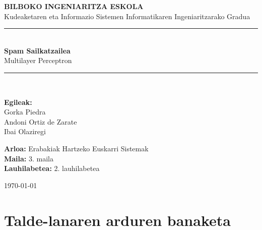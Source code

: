 \documentclass[12pt, a4paper]{article}
\begin{document}
\begin{titlepage}
    \centering
    \vspace*{1.5cm}
    {\Large \textbf{BILBOKO INGENIARITZA ESKOLA}}\\[0.3cm]
    {\normalsize Kudeaketaren eta Informazio Sistemen Informatikaren Ingeniaritzarako Gradua}\\[2cm]
    \rule{\textwidth}{1.5pt}\\[0.5cm]
    {\Huge \textbf{Spam Sailkatzailea}}\\[0.4cm]
    {\Large Multilayer Perceptron }\\[0.3cm]
    \rule{\textwidth}{1.5pt}\\[2cm]

    \begin{minipage}{0.45\textwidth}
        \textbf{Egileak:}\\
        Gorka Piedra\\
        Andoni Ortiz de Zarate\\
        Ibai Olaziregi\\
    \end{minipage}
    \begin{minipage}{0.45\textwidth}
        \raggedleft
        \textbf{Arloa:} Erabakiak Hartzeko Euskarri Sistemak\\[0.2cm]
        \textbf{Maila:} 3. maila\\
        \textbf{Lauhilabetea:} 2. lauhilabetea\\
    \end{minipage}
    \vfill
    {\large \today}
\end{titlepage}

\tableofcontents
\newpage

\section{Talde-lanaren arduren banaketa}
\end{document}
